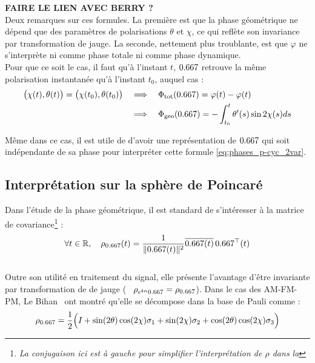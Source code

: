 \textbf{\textsc{\color{red} FAIRE LE LIEN AVEC BERRY \cite{berry_quantal_1997} ?}}
\\

Deux remarques sur ces formules. 
La première est que la phase géométrique ne dépend que des paramètres de polarisations $\theta$ et $\chi$, ce qui reflète son invariance par transformation de jauge.
La seconde, nettement plus troublante, est que $\varphi$ ne s'interprète ni comme phase totale ni comme phase dynamique.
\\
Pour que ce soit le cas, il faut qu'à l'instant $t$, $\x $ retrouve la même polarisation instantanée qu'à l'instant $t_0$, auquel cas :
\begin{equation}\label{eq:phases_p-cyc_2var}
	\begin{aligned}
		\big( \chi(t), \theta(t) \big) = \big( \chi(t_0), \theta(t_0) \big)\quad 
		&\Lr\quad \phaset(\x ) = \varphi(t) - \varphi(t) \\
		&\Lr\quad \phaseg(\x ) = -\int_{t_0}^t \theta'(s) \sin 2\chi(s) ds
	\end{aligned}
\end{equation}
\skipl

Même dans ce cas, il est utile de d'avoir une représentation de $\x $ qui soit indépendante de sa phase pour interpréter cette formule \eqref{eq:phases_p-cyc_2var}.
\\



\subsection{Interprétation sur la sphère de Poincaré}\label{subsec:phase_g2Poincare}

Dans l'étude de la phase géométrique, il est standard de s'intéresser à la matrice de covariance\footnote{\itshape
	La conjugaison ici est à gauche pour simplifier l'interprétation de $\rho$ dans la 
} :
\begin{equation} \label{eq:proj2x_2var}
	\forall t\in\R,\quad \rho_{\x}(t) = \frac{1}{\|\x(t) \|^2} \congu{\x(t) }\, \transp{\x}(t)
\end{equation}
\\
Outre son utilité en traitement du signal, elle présente l'avantage d'être invariante par transformation de de jauge (\ie~ $\rho_{e^{\i \alpha}\x} = \rho_{\x}$).
Dans le cas des AM-FM-PM, Le Bihan \etal~ont montré qu'elle se décompose dans la base de Pauli comme :
\begin{equation} \label{eq:decompo_pauli}
	\rho_{\x} = \frac{1}{2}\Big( \Id + \sin(2\theta) \cos(2\chi) \sigma_1 + \sin (2\chi) \sigma_2 + \cos(2\theta) \cos(2\chi) \sigma_3 \Big)
\end{equation}


